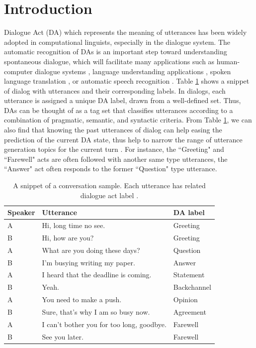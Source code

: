 \documentclass[conference]{IEEEtran}
\begin{document}
	\section{Introduction}
	Dialogue Act (DA) which represents the meaning of utterances has been widely adopted in computational linguists, especially in the dialogue system. The automatic recognition of DAs is an important step toward understanding spontaneous dialogue, which will facilitate many applications such as human-computer dialogue systems \cite{traum1999speech}, language understanding applications \cite{ezen2015understanding}, spoken language translation \cite{reithinger1996predicting}, or automatic speech recognition \cite{stolcke2000dialogue}. Table \ref{table:dataset} shows a snippet of dialog with utterances and their corresponding labels. In dialogs, each utterance is assigned a unique DA label, drawn from a well-defined set. Thus, DAs can be thought of as a tag set that classifies utterances according to a combination of pragmatic, semantic, and syntactic criteria.
	From Table \ref{table:dataset}, we can also find that knowing the past utterances of dialog can help easing the prediction of the current DA state, thus help to narrow the range of utterance generation topics for the current turn \cite{chen2018dialogue}. For instance, the ``Greeting" and ``Farewell" acts are often followed with another same type utterances, the ``Answer" act often responds to the former ``Question" type utterance. 
	\begin{table}[!t]
		\centering
		\begin{tabular}{lll}
			\hline
			\textbf{Speaker}&\textbf{Utterance}&\textbf{DA label}\\
			\hline
			A & Hi, long time no see. & Greeting \\
			B & Hi, how are you? & Greeting \\
			A & What are you doing these days? &Question \\
			B & I'm busying writing my paper. &Answer \\
			A & I heard that the deadline is coming. &Statement \\
			B & Yeah. &Backchannel \\
			A & You need to make a push.&Opinion \\
			B & Sure, that’s why I am so busy now. &Agreement \\
			A & I can't bother you for too long, goodbye. &Farewell \\
			B &See you later.&Farewell \\
			\hline
		\end{tabular}
		\caption{A snippet of a conversation sample. Each utterance has related dialogue act label \cite{chen2018dialogue}.}
		\label{table:dataset}
	\end{table}
	
\end{document}
